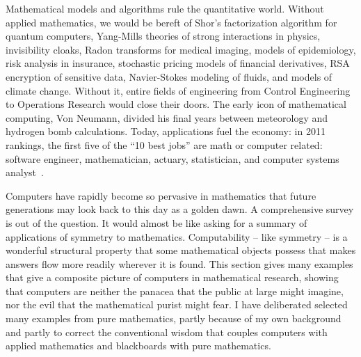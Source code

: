 \documentclass{llncs}
\begin{document}
Mathematical models and algorithms rule the quantitative world.
Without applied mathematics, we would be bereft of Shor's
factorization algorithm for quantum computers, Yang-Mills theories of
strong interactions in physics, invisibility cloaks, Radon transforms
for medical imaging, models of epidemiology, risk analysis in
insurance, stochastic pricing models of financial derivatives, RSA
encryption of sensitive data, Navier-Stokes modeling of fluids, and
models of climate change.
Without it, entire fields of engineering from Control Engineering to
Operations Research would close their doors.  The early icon of
mathematical computing, Von Neumann, divided his final years between
meteorology and hydrogen bomb calculations.
Today, applications fuel the
economy: in 2011 rankings, the first five of the ``10 best jobs'' are
math or computer related: software engineer, mathematician, actuary,
statistician, and computer systems analyst~\cite{CC11}.  








\bigskip

Computers have rapidly become so pervasive in mathematics that future
generations may look back to this day as a golden dawn.  A
comprehensive survey is out of the question.  It would almost be like
asking for a summary of applications of symmetry to mathematics.
Computability -- like symmetry -- is a wonderful structural property
that some mathematical objects possess that makes answers flow more
readily wherever it is found.  This section gives many examples that
give a composite picture of computers in mathematical research,
showing that computers are neither the panacea that the public at
large might imagine, nor the evil that the mathematical purist might
fear.  I have deliberated selected many examples from pure
mathematics, partly because of my own background and partly to correct
the conventional wisdom that couples computers with applied
mathematics and blackboards with pure mathematics.
\end{document}

